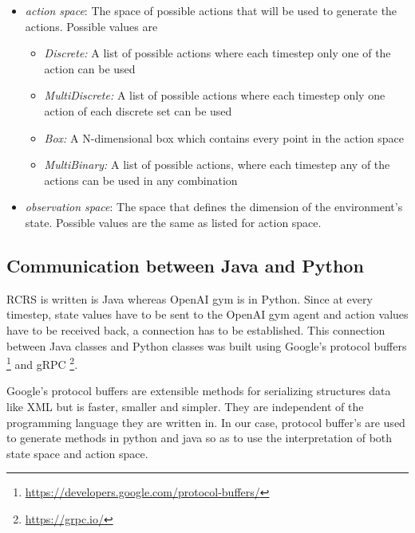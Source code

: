 \documentclass[12pt]{report}
\begin{document}
\begin{itemize}
    \item \emph{action space}: The space of possible actions that will be used to generate the actions. Possible values are 
    \begin{itemize}
        \item \emph{Discrete:} A list of possible actions where each timestep only one of the action can be used
        \item \emph{MultiDiscrete:} A list of possible actions where each timestep only one action of each discrete set can be used
        \item \emph{Box:} A N-dimensional box which contains every point in the action space
        \item \emph{MultiBinary:} A list of possible actions, where each timestep any of the actions can be used in any combination
    \end{itemize}
    
    \item \emph{observation space}: The space that defines the dimension of the environment's state. Possible values are the same as listed for action space. 
\end{itemize}

\subsection{Communication between Java and Python} \label{CommunicationJavaPython}

RCRS is written is Java whereas OpenAI gym is in Python. Since at every timestep, state values have to be sent to the OpenAI gym agent and action values have to be received back, a connection has to be established. This connection between Java classes and Python classes was built using Google's protocol buffers \footnote{\url{https://developers.google.com/protocol-buffers/}}  and gRPC \footnote{\url{https://grpc.io/}}. 

Google's protocol buffers are extensible methods for serializing structures data like XML but is faster, smaller and simpler. They are independent of the programming language they are written in. In our case, protocol buffer's are used to generate methods in python and java so as to use the interpretation of both state space and action space. 
\end{document}
